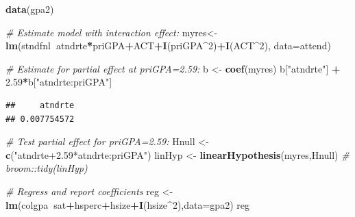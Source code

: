 \documentclass[]{book}
\newenvironment{Shaded}{\begin{snugshade}}{\end{snugshade}}
\newcommand{\CommentTok}[1]{\textcolor[rgb]{0.56,0.35,0.01}{\textit{#1}}}
\newcommand{\DataTypeTok}[1]{\textcolor[rgb]{0.13,0.29,0.53}{#1}}
\newcommand{\DecValTok}[1]{\textcolor[rgb]{0.00,0.00,0.81}{#1}}
\newcommand{\FloatTok}[1]{\textcolor[rgb]{0.00,0.00,0.81}{#1}}
\newcommand{\KeywordTok}[1]{\textcolor[rgb]{0.13,0.29,0.53}{\textbf{#1}}}
\newcommand{\NormalTok}[1]{#1}
\newcommand{\OperatorTok}[1]{\textcolor[rgb]{0.81,0.36,0.00}{\textbf{#1}}}
\newcommand{\StringTok}[1]{\textcolor[rgb]{0.31,0.60,0.02}{#1}}
\begin{document}
\begin{Shaded}
\begin{Highlighting}[]
\KeywordTok{data}\NormalTok{(gpa2)}
\end{Highlighting}
\end{Shaded}

\begin{Shaded}
\begin{Highlighting}[]
\CommentTok{# Estimate model with interaction effect:}
\NormalTok{myres<-}\KeywordTok{lm}\NormalTok{(stndfnl}\OperatorTok{~}\NormalTok{atndrte}\OperatorTok{*}\NormalTok{priGPA}\OperatorTok{+}\NormalTok{ACT}\OperatorTok{+}\KeywordTok{I}\NormalTok{(priGPA}\OperatorTok{^}\DecValTok{2}\NormalTok{)}\OperatorTok{+}\KeywordTok{I}\NormalTok{(ACT}\OperatorTok{^}\DecValTok{2}\NormalTok{), }\DataTypeTok{data=}\NormalTok{attend)}

\CommentTok{# Estimate for partial effect at priGPA=2.59:}
\NormalTok{b <-}\StringTok{ }\KeywordTok{coef}\NormalTok{(myres)}
\NormalTok{b[}\StringTok{"atndrte"}\NormalTok{] }\OperatorTok{+}\StringTok{ }\FloatTok{2.59}\OperatorTok{*}\NormalTok{b[}\StringTok{"atndrte:priGPA"}\NormalTok{] }
\end{Highlighting}
\end{Shaded}

\begin{verbatim}
##     atndrte 
## 0.007754572
\end{verbatim}

\begin{Shaded}
\begin{Highlighting}[]
\CommentTok{# Test partial effect for priGPA=2.59:}
\NormalTok{Hnull <-}\StringTok{ }\KeywordTok{c}\NormalTok{(}\StringTok{"atndrte+2.59*atndrte:priGPA"}\NormalTok{)}
\NormalTok{linHyp <-}\StringTok{ }\KeywordTok{linearHypothesis}\NormalTok{(myres,Hnull)}
\CommentTok{# broom::tidy(linHyp)}
\end{Highlighting}
\end{Shaded}

\begin{Shaded}
\begin{Highlighting}[]
\CommentTok{# Regress and report coefficients}
\NormalTok{reg <-}\StringTok{ }\KeywordTok{lm}\NormalTok{(colgpa}\OperatorTok{~}\NormalTok{sat}\OperatorTok{+}\NormalTok{hsperc}\OperatorTok{+}\NormalTok{hsize}\OperatorTok{+}\KeywordTok{I}\NormalTok{(hsize}\OperatorTok{^}\DecValTok{2}\NormalTok{),}\DataTypeTok{data=}\NormalTok{gpa2)}
\NormalTok{reg}
\end{Highlighting}
\end{Shaded}
\end{document}
